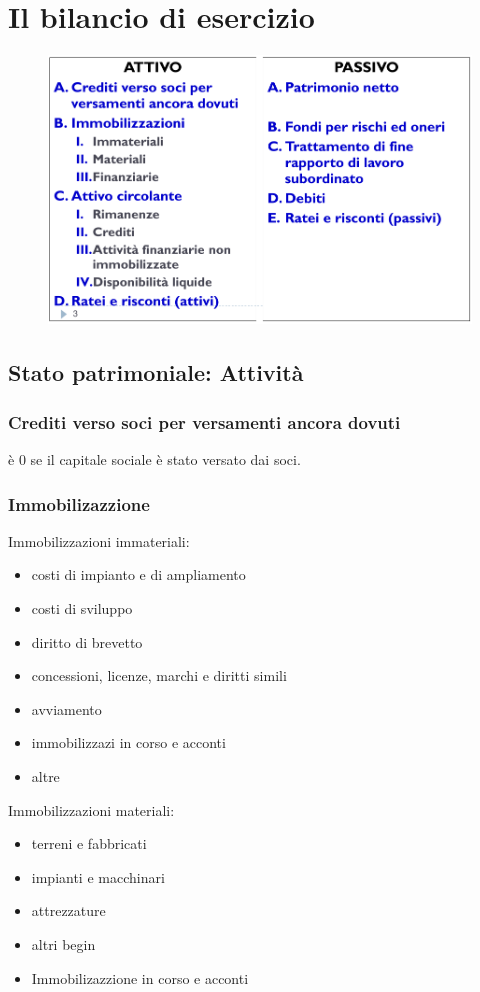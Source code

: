 \section{Il bilancio di esercizio}
\begin{figure}[H]
    \centering
    \includegraphics[width=0.7\linewidth]{2/img/Screenshot from 2022-07-06 22-20-49.png}
\end{figure}
\subsection{Stato patrimoniale: Attività}


\subsubsection{Crediti verso soci per versamenti ancora dovuti}

è 0 se il capitale sociale è stato versato dai soci.

\subsubsection{Immobilizazzione}
Immobilizzazioni immateriali:
\begin{itemize}
    \item costi di impianto e di ampliamento
    \item costi di sviluppo
    \item diritto di brevetto
    \item concessioni, licenze, marchi e diritti simili
    \item avviamento
    \item immobilizzazi in corso e acconti
    \item altre
\end{itemize}

Immobilizzazioni materiali:
\begin{itemize}
    \item terreni e fabbricati
    \item impianti e macchinari
    \item attrezzature
    \item altri begin
    \item Immobilizazzione in  corso e acconti
\end{itemize}


